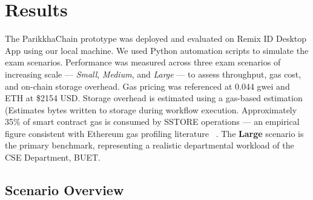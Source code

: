 \documentclass[conference]{IEEEtran}
\begin{document}





\section{Results}
\label{sec:results}

The ParikkhaChain prototype was deployed and evaluated on Remix ID Desktop App using our local machine. We used Python automation scripts to simulate the exam scenarios.
Performance was measured across three exam scenarios of increasing scale ---
\emph{Small}, \emph{Medium}, and \emph{Large} --- to assess throughput, gas
cost, and on-chain storage overhead. Gas pricing was referenced at 0.044 gwei and ETH at \$2154 USD. Storage overhead is
estimated using a gas-based estimation (Estimates bytes written to storage during workflow execution. Approximately 35\% of smart contract gas is consumed by SSTORE
operations — an empirical figure consistent with Ethereum gas profiling literature  ~\cite{wood2014ethereum}.
The \textbf{Large} scenario is the primary benchmark, representing a
realistic departmental workload of the CSE Department, BUET.

\subsection{Scenario Overview}



\end{document}
